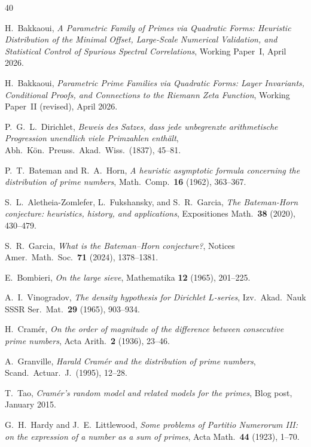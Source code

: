 \documentclass[11pt,a4paper]{article}
\theoremstyle{plain}
\theoremstyle{definition}
\begin{document}
\begin{thebibliography}{40}

 H.~Bakkaoui, \textit{A Parametric Family of Primes via Quadratic
Forms: Heuristic Distribution of the Minimal Offset, Large-Scale Numerical
Validation, and Statistical Control of Spurious Spectral Correlations}, Working
Paper~I, April 2026.

 H.~Bakkaoui, \textit{Parametric Prime Families via Quadratic
Forms: Layer Invariants, Conditional Proofs, and Connections to the Riemann
Zeta Function}, Working Paper~II (revised), April 2026.

 P.~G.~L.~Dirichlet, \textit{Beweis des Satzes, dass jede
unbegrenzte arithmetische Progression unendlich viele Primzahlen enth\"{a}lt},
Abh.\ K\"{o}n.\ Preuss.\ Akad.\ Wiss.\ (1837), 45--81.

 P.~T.~Bateman and R.~A.~Horn, \textit{A heuristic
asymptotic formula concerning the distribution of prime numbers}, Math.\ Comp.\
\textbf{16} (1962), 363--367.

 S.~L.~Aletheia-Zomlefer, L.~Fukshansky, and S.~R.~Garcia,
\textit{The Bateman-Horn conjecture: heuristics, history, and applications},
Expositiones Math.\ \textbf{38} (2020), 430--479.

 S.~R.~Garcia, \textit{What is the Bateman--Horn conjecture?},
Notices Amer.\ Math.\ Soc.\ \textbf{71} (2024), 1378--1381.

 E.~Bombieri, \textit{On the large sieve}, Mathematika
\textbf{12} (1965), 201--225.

 A.~I.~Vinogradov, \textit{The density hypothesis for
Dirichlet $L$-series}, Izv.\ Akad.\ Nauk SSSR Ser.\ Mat.\ \textbf{29} (1965),
903--934.

 H.~Cram\'{e}r, \textit{On the order of magnitude of the
difference between consecutive prime numbers}, Acta Arith.\ \textbf{2} (1936),
23--46.

 A.~Granville, \textit{Harald Cram\'{e}r and the distribution
of prime numbers}, Scand.\ Actuar.\ J.\ (1995), 12--28.

 T.~Tao, \textit{Cram\'{e}r's random model and related models for
the primes}, Blog post, January 2015.

 G.~H.~Hardy and J.~E.~Littlewood, \textit{Some
problems of Partitio Numerorum III: on the expression of a number as a sum of
primes}, Acta Math.\ \textbf{44} (1923), 1--70.


\end{thebibliography}
\end{document}
